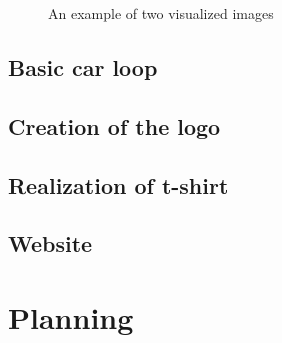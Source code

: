\documentclass[12pt]{article}
\begin{document}
\begin{figure}[h]
    \centering
    \hfill%
    \caption{An example of two visualized images}
\end{figure}

\subsection{Basic car loop}

\subsection{Creation of the logo}

\subsection{Realization of t-shirt}

\subsection{Website}


\section {Planning}
\end{document}
